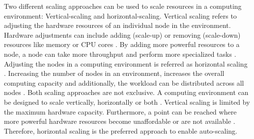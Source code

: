 Two different scaling approaches can be used to scale resources in a computing environment: Vertical-scaling and horizontal-scaling.
Vertical scaling refers to adjusting the hardware resources of an individual node in the environment. Hardware adjustments can include adding (scale-up) or removing (scale-down) resources like memory or CPU cores \cite{Wilder2012CloudPatterns}. By adding more powerful resources to a node, a node can take more throughput and perform more specialized tasks \cite{Abbott2015ScalabilityArt}.
Adjusting the nodes in a computing environment is referred as horizontal scaling \cite{Wilder2012CloudPatterns}. Increasing the number of nodes in an environment, increases the overall computing capacity and additionally, the workload can be distributed across all nodes \cite{Wilder2012CloudPatterns, Abbott2015ScalabilityArt}.
Both scaling approaches are not exclusive. A computing environment can be designed to scale vertically, horizontally or both \cite{Wilder2012CloudPatterns}.
Vertical scaling is limited by the maximum hardware capacity. Furthermore, a point can be reached where more powerful hardware resources become unaffordable or are not available \cite{Abbot2011ScalabilityRules}.  Therefore, horizontal scaling is the preferred approach to enable auto-scaling.


